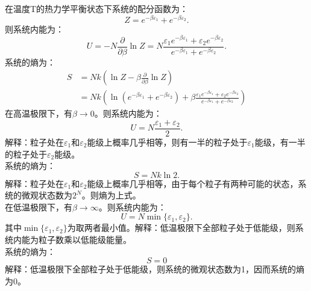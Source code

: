 \documentclass[a4paper,12pt]{article}
\begin{document}
\section{}
在温度T的热力学平衡状态下系统的配分函数为：
\begin{equation}\nonumber
	Z = e^{-\beta \varepsilon_1}+e^{-\beta \varepsilon_2}.
\end{equation}
则系统内能为：
\begin{equation}\nonumber
	U = -N\frac{\partial}{\partial \beta}\ln Z = N\frac{\varepsilon_1e^{-\beta\varepsilon_1}+\varepsilon_2e^{-\beta\varepsilon_2}}{e^{-\beta\varepsilon_1}+e^{-\beta\varepsilon_2}}.
\end{equation}
系统的熵为：
\begin{equation}\nonumber
\begin{aligned}
	S &= Nk\left( \ln Z-\beta\frac{\partial}{\partial\beta} \ln Z \right) \\
	&= Nk \left( \ln\left( e^{-\beta\varepsilon_1}+e^{-\beta\varepsilon_2} \right) + \beta \frac{\varepsilon_1e^{-\beta\varepsilon_1}+\varepsilon_2e^{-\beta\varepsilon_2}}{e^{-\beta\varepsilon_1}+e^{-\beta\varepsilon_2}} \right)
\end{aligned}
\end{equation}
在高温极限下，有$\beta \to 0$。则系统内能为：
\begin{equation}\nonumber
	U = N\frac{\varepsilon_1+\varepsilon_2}{2}.
\end{equation}
解释：粒子处在$\varepsilon_1$和$\varepsilon_2$能级上概率几乎相等，则有一半的粒子处于$\varepsilon_1$能级，有一半的粒子处于$\varepsilon_2$能级。 \\
系统的熵为：
\begin{equation}\nonumber
	S = Nk\ln2.
\end{equation}
解释：粒子处在$\varepsilon_1$和$\varepsilon_2$能级上概率几乎相等，由于每个粒子有两种可能的状态，系统的微观状态数为$2^N$。则熵为上式。 \\
在低温极限下，有$\beta \to \infty$。则系统内能为：
\begin{equation}\nonumber
	U = N \min\{\varepsilon_1,\varepsilon_2\}.
\end{equation}
其中$\min\{ \varepsilon_1,\varepsilon_2 \}$为取两者最小值。解释：低温极限下全部粒子处于低能级，则系统内能为粒子数乘以低能级能量。 \\
系统的熵为：
\begin{equation}\nonumber
	S = 0
\end{equation}
解释：低温极限下全部粒子处于低能级，则系统的微观状态数为1，因而系统的熵为0。 
\end{document}
